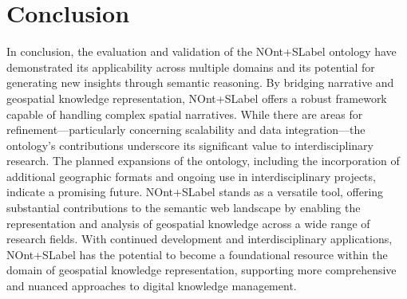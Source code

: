 \section{Conclusion}

In conclusion, the evaluation and validation of the \acrshort{NOnt+SLabel} ontology have demonstrated its applicability across multiple domains and its potential for generating new insights through semantic reasoning. By bridging narrative and geospatial knowledge representation, \acrshort{NOnt+SLabel} offers a robust framework capable of handling complex spatial narratives. While there are areas for refinement—particularly concerning scalability and data integration—the ontology’s contributions underscore its significant value to interdisciplinary research. The planned expansions of the ontology, including the incorporation of additional geographic formats and ongoing use in interdisciplinary projects, indicate a promising future. \acrshort{NOnt+SLabel} stands as a versatile tool, offering substantial contributions to the semantic web landscape by enabling the representation and analysis of geospatial knowledge across a wide range of research fields. With continued development and interdisciplinary applications, \acrshort{NOnt+SLabel} has the potential to become a foundational resource within the domain of geospatial knowledge representation, supporting more comprehensive and nuanced approaches to digital knowledge management.
